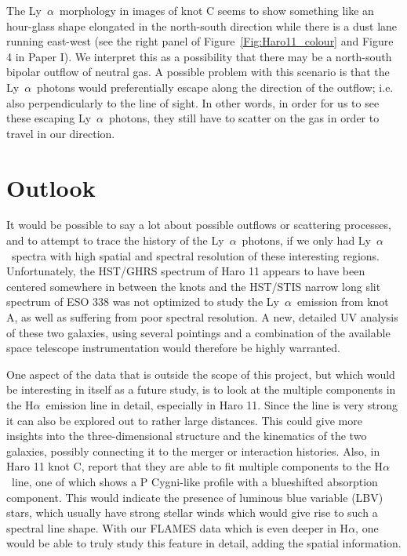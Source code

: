 \documentclass[a4wide,12pt]{book}
\newcommand{\ha}{H${\alpha}$}
\newcommand{\lya}{Ly~${\alpha}$}
\begin{document}
{The \lya\ morphology in images of knot C seems to show something like an hour-glass shape elongated in the north-south direction while there is a dust lane running east-west (see the right panel of Figure~\ref{Fig:Haro11_colour} and Figure 4 in Paper I). We interpret this as a possibility that there may be a north-south bipolar outflow of neutral gas. A possible problem with this scenario is that the \lya\ photons would preferentially escape along the direction of the outflow; i.e. also perpendicularly to the line of sight. In other words, in order for us to see these escaping \lya\ photons, they still have to scatter on the gas in order to travel in our direction. 


\section{Outlook}

It would be possible to say a lot about possible outflows or scattering processes, and to attempt to trace the history of the \lya\ photons, if we only had \lya\ spectra with high spatial and spectral resolution of these interesting regions. Unfortunately, the HST/GHRS spectrum of Haro 11 appears to have been centered somewhere in between the knots and the HST/STIS narrow long slit spectrum of ESO 338 was not optimized to study the \lya\ emission from knot A, as well as suffering from poor spectral resolution. A new, detailed UV analysis of these two galaxies, using several pointings and a combination of the available space telescope instrumentation would therefore be highly warranted.


One aspect of the data that is outside the scope of this project, but which would be interesting in itself as a future study, is to look at the multiple components in the \ha\ emission line in detail, especially in Haro 11. Since the line is very strong it can also be explored out to rather large distances. This could give more insights into the three-dimensional structure and the kinematics of the two galaxies, possibly connecting it to the merger or interaction histories. Also, in Haro 11 knot C, \citet{guseva-2012} report that they are able to fit multiple components to the \ha\ line, one of which shows a P Cygni-like profile with a blueshifted absorption component. This would indicate the presence of luminous blue variable (LBV) stars, which usually have strong stellar winds which would give rise to such a spectral line shape. With our FLAMES data which is even deeper in \ha , one would be able to truly study this feature in detail, adding the spatial information.  

}
\end{document}
